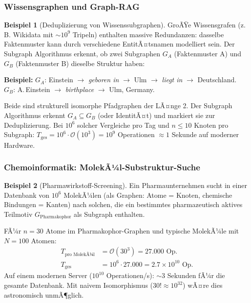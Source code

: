 ﻿\documentclass[12pt,a4paper,twoside]{article}
\theoremstyle{definition}
\newtheorem{beispiel}{Beispiel}[section]
\theoremstyle{plain}
\theoremstyle{remark}
\begin{document}
\subsubsection{Wissensgraphen und Graph-RAG}

\begin{beispiel}[Deduplizierung von Wissenssubgraphen]
GroÃŸe Wissensgrafen (z.\,B. Wikidata mit $\sim 10^9$
Tripeln) enthalten massive Redundanzen: dasselbe
Faktenmuster kann durch verschiedene EntitÃ¤tsnamen
modelliert sein.  Der Subgraph Algorithmus erkennt,
ob zwei Subgraphen $G_A$ (Faktenmuster A) und
$G_B$ (Faktenmuster B) dieselbe Struktur haben:

\textbf{Beispiel:}
$G_A$: Einstein $\to$ \textit{geboren in} $\to$ Ulm
$\to$ \textit{liegt in} $\to$ Deutschland.\\
$G_B$: A.\,Einstein $\to$ \textit{birthplace} $\to$ Ulm, Germany.

Beide sind strukturell isomorphe Pfadgraphen der LÃ¤nge 2.
Der Subgraph Algorithmus erkennt $G_A \subseteq G_B$
(oder IdentitÃ¤t) und markiert sie zur Deduplizierung.
Bei $10^6$ solcher Vergleiche pro Tag und
$n \leq 10$ Knoten pro Subgraph:
$T_{\text{ges}} = 10^6 \cdot \mathcal{O}(10^3) = 10^9$
Operationen $\approx 1$ Sekunde auf moderner Hardware.
\end{beispiel}

\subsubsection{Chemoinformatik: MolekÃ¼l-Substruktur-Suche}

\begin{beispiel}[Pharmawirkstoff-Screening]
Ein Pharmaunternehmen sucht in einer Datenbank von
$10^6$ MolekÃ¼len (als Graphen: Atome = Knoten,
chemische Bindungen = Kanten) nach solchen,
die ein bestimmtes pharmazeutisch aktives Teilmotiv
$G_{\text{Pharmakophor}}$ als Subgraph enthalten.

FÃ¼r $n = 30$ Atome im Pharmakophor-Graphen
und typische MolekÃ¼le mit $N = 100$ Atomen:
\begin{align*}
  T_{\text{pro MolekÃ¼l}} &= \mathcal{O}(30^3) = 27.000 \text{ Op.} \\
  T_{\text{ges}} &= 10^6 \cdot 27.000 = 2.7 \times 10^{10} \text{ Op.}
\end{align*}
Auf einem modernen Server ($10^{10}$ Operationen/s):
$\sim 3$ Sekunden fÃ¼r die gesamte Datenbank.
Mit naivem Isomorphismus ($30! \approx 10^{32}$) wÃ¤re
dies astronomisch unmÃ¶glich.
\end{beispiel}
\end{document}
